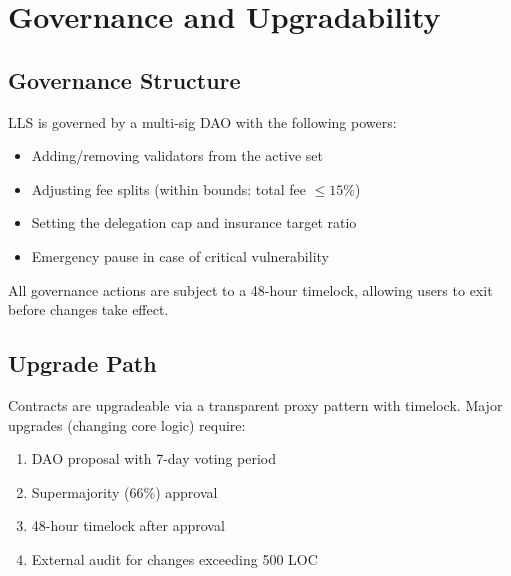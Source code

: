 \section{Governance and Upgradability}
\label{sec:governance}

\subsection{Governance Structure}

LLS is governed by a multi-sig DAO with the following powers:
\begin{itemize}
    \item Adding/removing validators from the active set
    \item Adjusting fee splits (within bounds: total fee $\leq 15\%$)
    \item Setting the delegation cap and insurance target ratio
    \item Emergency pause in case of critical vulnerability
\end{itemize}

All governance actions are subject to a 48-hour timelock, allowing users to exit before changes take effect.

\subsection{Upgrade Path}

Contracts are upgradeable via a transparent proxy pattern with timelock. Major upgrades (changing core logic) require:
\begin{enumerate}
    \item DAO proposal with 7-day voting period
    \item Supermajority (66\%) approval
    \item 48-hour timelock after approval
    \item External audit for changes exceeding 500 LOC
\end{enumerate}


